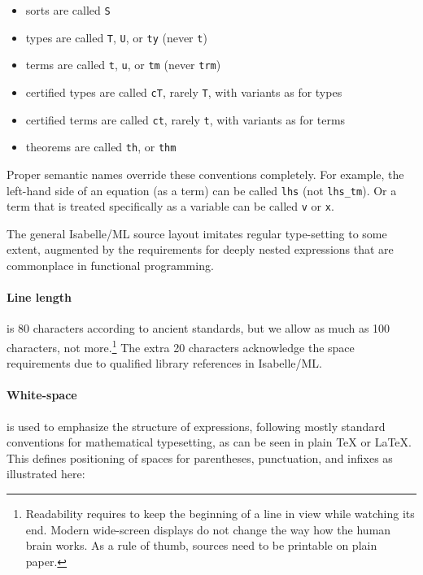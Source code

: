 \begin{isabellebody}
\begin{isamarkuptext}
\begin{itemize}
\begin{itemize}
  \item sorts are called \verb|S|

  \item types are called \verb|T|, \verb|U|, or \verb|ty| (never \verb|t|)

  \item terms are called \verb|t|, \verb|u|, or \verb|tm| (never \verb|trm|)

  \item certified types are called \verb|cT|, rarely \verb|T|, with variants as for types

  \item certified terms are called \verb|ct|, rarely \verb|t|, with variants as for terms

  \item theorems are called \verb|th|, or \verb|thm|

  \end{itemize}

  Proper semantic names override these conventions completely.  For
  example, the left-hand side of an equation (as a term) can be called
  \verb|lhs| (not \verb|lhs_tm|).  Or a term that is treated
  specifically as a variable can be called \verb|v| or \verb|x|.

  \end{itemize}%
\end{isamarkuptext}%
\isamarkuptrue%
%
\isamarkuptrue%
%
\begin{isamarkuptext}%
The general Isabelle/ML source layout imitates regular
  type-setting to some extent, augmented by the requirements for
  deeply nested expressions that are commonplace in functional
  programming.

  \paragraph{Line length} is 80 characters according to ancient
  standards, but we allow as much as 100 characters, not
  more.\footnote{Readability requires to keep the beginning of a line
  in view while watching its end.  Modern wide-screen displays do not
  change the way how the human brain works.  As a rule of thumb,
  sources need to be printable on plain paper.} The extra 20
  characters acknowledge the space requirements due to qualified
  library references in Isabelle/ML.

  \paragraph{White-space} is used to emphasize the structure of
  expressions, following mostly standard conventions for mathematical
  typesetting, as can be seen in plain {\TeX} or {\LaTeX}.  This
  defines positioning of spaces for parentheses, punctuation, and
  infixes as illustrated here:


\end{isamarkuptext}
\end{isabellebody}
